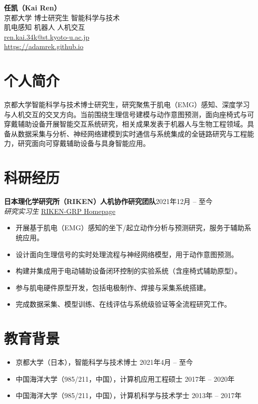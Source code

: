 \documentclass[10pt,letterpaper]{article}
\newcommand{\entry}[2]{\textbf{#1}\hfill #2}
\newcommand{\link}[2]{\href{#1}{#2}}
\begin{document}
\begin{center}
  {\LARGE \textbf{任凯（Kai Ren）}}\\
  京都大学 \textbar{} 博士研究生 \textbar{} 智能科学与技术\\
  肌电感知 \textbar{} 机器人 \textbar{} 人机交互\\
  \href{mailto:ren.kai.34k@st.kyoto-u.ac.jp}{ren.kai.34k@st.kyoto-u.ac.jp}\\
  \href{https://adamrek.github.io}{https://adamrek.github.io}
\end{center}

\section*{个人简介}
京都大学智能科学与技术博士研究生，研究聚焦于肌电（EMG）感知、深度学习与人机交互的交叉方向。当前围绕生理信号建模与动作意图预测，面向座椅式与可穿戴辅助设备开展智能交互系统研究，相关成果发表于机器人与生物工程领域。具备从数据采集与分析、神经网络建模到实时通信与系统集成的全链路研究与工程能力，研究面向可穿戴辅助设备与具身智能应用。

\section*{科研经历}
\entry{日本理化学研究所（RIKEN）人机协作研究团队}{2021年12月 -- 至今}\\
\textit{研究实习生} \hfill \link{https://grp.riken.jp/labs/man_machine_collab/}{RIKEN-GRP Homepage}
\begin{itemize}
  \item 开展基于肌电（EMG）感知的坐下/起立动作分析与预测研究，服务于辅助系统应用。
  \item 设计面向生理信号的实时处理流程与神经网络模型，用于动作意图预测。
  \item 构建并集成用于电动辅助设备闭环控制的实验系统（含座椅式辅助原型）。
  \item 参与肌电硬件原型开发，包括电极制作、焊接与采集系统搭建。
  \item 完成数据采集、模型训练、在线评估与系统级验证等全流程研究工作。
\end{itemize}

\section*{教育背景}
\begin{itemize}
  \item 京都大学（日本），智能科学与技术博士 \hfill 2021年4月 -- 至今
  \item 中国海洋大学（985/211，中国），计算机应用工程硕士 \hfill 2017年 -- 2020年
  \item 中国海洋大学（985/211，中国），计算机科学与技术学士 \hfill 2013年 -- 2017年
\end{itemize}
\end{document}
